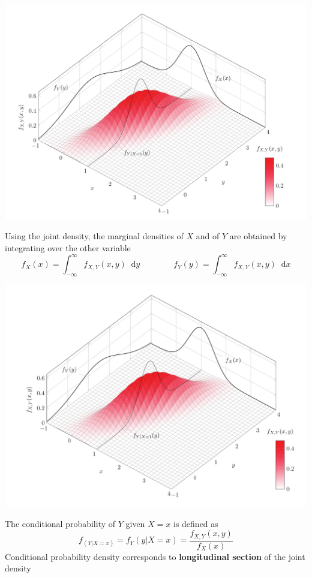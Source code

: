 \documentclass[11pt]{article}
\newcommand*\diff{\mathop{}\!\mathrm{d}}
\begin{document}
\begin{center}
	\includegraphics[width=0.8\linewidth]{img/marginal_density_xy}
\end{center}

Using the joint density, the marginal densities of $X$ and of $Y$ are obtained by integrating over the other variable
\begin{equation*}
	f_X(x) = \int_{-\infty}^{\infty}f_{X,Y}(x,y)\diff y \qquad\qquad f_Y(y) = \int_{-\infty}^{\infty}f_{X,Y}(x,y)\diff x
\end{equation*}

\begin{center}
	\includegraphics[width=0.8\linewidth]{img/conditional_probability_xy}
\end{center}

The conditional probability of $Y$ given $X = x$ is defined as
\begin{equation*}
	f_{(Y | X=x)} = f_Y (y | X=x) = \frac{f_{X,Y}(x,y)}{f_X(x)}
\end{equation*}
Conditional probability density corresponds to \textbf{longitudinal section} of the joint density
\end{document}
